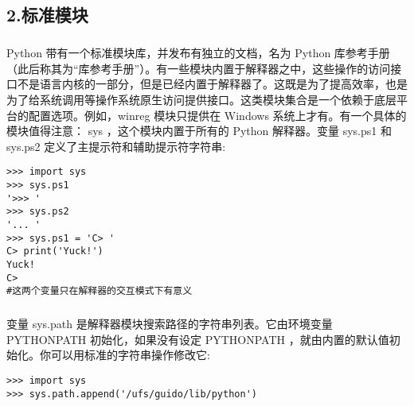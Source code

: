 \documentclass{article}
\begin{document}
\begin{CJK}{UTF8}{gbsn}
\section*{2.标准模块}
\subparagraph*{}
Python 带有一个标准模块库，并发布有独立的文档，名为 Python 库参考手册（此后称其为“库参考手册”）。有一些模块内置于解释器之中，这些操作的访问接口不是语言内核的一部分，但是已经内置于解释器了。这既是为了提高效率，也是为了给系统调用等操作系统原生访问提供接口。这类模块集合是一个依赖于底层平台的配置选项。例如，winreg 模块只提供在 Windows 系统上才有。有一个具体的模块值得注意： sys ，这个模块内置于所有的 Python 解释器。变量 sys.ps1 和 sys.ps2 定义了主提示符和辅助提示符字符串:
\begin{verbatim}
>>> import sys
>>> sys.ps1
'>>> '
>>> sys.ps2
'... '
>>> sys.ps1 = 'C> '
C> print('Yuck!')
Yuck!
C>
#这两个变量只在解释器的交互模式下有意义
\end{verbatim}
\subparagraph*{}
变量 sys.path 是解释器模块搜索路径的字符串列表。它由环境变量 PYTHONPATH 初始化，如果没有设定 PYTHONPATH ，就由内置的默认值初始化。你可以用标准的字符串操作修改它:
\begin{verbatim}
>>> import sys
>>> sys.path.append('/ufs/guido/lib/python')
\end{verbatim}

\end{CJK}
\end{document}

